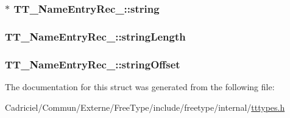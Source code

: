 \hypertarget{struct_t_t___name_entry_rec___aefa752d5c88149f8e64122e14855d831}{
\subsubsection[{string}]{$\ast$ T\-T\-\_\-\-Name\-Entry\-Rec\-\_\-\-::string}}\label{struct_t_t___name_entry_rec___aefa752d5c88149f8e64122e14855d831}
\hypertarget{struct_t_t___name_entry_rec___a736e5f8caeada86cc33f62acca6537f5}{
\subsubsection[{string\-Length}]{ T\-T\-\_\-\-Name\-Entry\-Rec\-\_\-\-::string\-Length}}\label{struct_t_t___name_entry_rec___a736e5f8caeada86cc33f62acca6537f5}
\hypertarget{struct_t_t___name_entry_rec___a33ed41d4d3c4fffa74193f3b52e11870}{
\subsubsection[{string\-Offset}]{ T\-T\-\_\-\-Name\-Entry\-Rec\-\_\-\-::string\-Offset}}\label{struct_t_t___name_entry_rec___a33ed41d4d3c4fffa74193f3b52e11870}


The documentation for this struct was generated from the following file\-:\begin{DoxyCompactItemize}
\item 
Cadriciel/\-Commun/\-Externe/\-Free\-Type/include/freetype/internal/\hyperlink{tttypes_8h}{tttypes.\-h}\end{DoxyCompactItemize}
